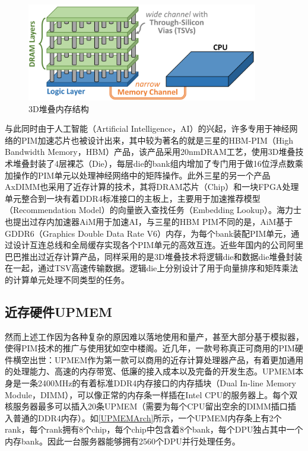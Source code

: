 \begin{figure}[!htbp]
	\centering
    \includegraphics[width=0.9\textwidth]{figures/3DStack.png}
    \caption{3D堆叠内存结构}
	\label{3DStack}
\end{figure}

与此同时由于人工智能（Artificial Intelligence，AI）的兴起，许多专用于神经网络的PIM加速芯片也被设计出来，其中较为著名的就是三星的HBM-PIM（High Bandwidth Memory，HBM）产品\cite{SamsungHBMPIM}，该产品采用20nmDRAM工艺，使用3D堆叠技术堆叠封装了4层裸芯（Die），每层die的bank组内增加了专门用于做16位浮点数乘加操作的PIM单元以处理神经网络中的矩阵操作。此外三星的另一个产品AxDIMM\cite{AxDIMM}也采用了近存计算的技术，其将DRAM芯片（Chip）和一块FPGA处理单元整合到一块有着DDR4标准接口的主板上，主要用于加速推荐模型（Recommendation Model）的向量嵌入查找任务（Embedding Lookup）。海力士也提出过存内加速器AiM\cite{AiM}用于加速AI，与三星的HBM PIM不同的是，AiM基于GDDR6（Graphics Double Data Rate V6）内存，为每个bank装配PIM单元，通过设计互连总线和全局缓存实现各个PIM单元的高效互连。近些年国内的公司阿里巴巴推出过近存计算产品\cite{AlibabaPIM}，同样采用的是3D堆叠技术将逻辑die和数据die堆叠封装在一起，通过TSV高速传输数据。逻辑die上分别设计了用于向量排序和矩阵乘法的计算单元处理不同类型的任务。

\subsection{近存硬件UPMEM}
然而上述工作因为各种复杂的原因难以落地使用和量产，甚至大部分基于模拟器，使得PIM技术的推广与使用犹如空中楼阁。近几年，一款号称真正可商用的PIM硬件横空出世：UPMEM作为第一款可以商用的近存计算处理器产品\cite{UPMEMHotChips}，有着更加通用的处理能力、高速的内存带宽、低廉的接入成本以及完备的开发生态。UPMEM本身是一条2400MHz的有着标准DDR4内存接口的内存插块（Dual In-line Memory Module，DIMM），可以像正常的内存条一样插在Intel CPU的服务器上。每个双核服务器最多可以插入20条UPMEM（需要为每个CPU留出空余的DIMM插口插入普通的DDR4内存）。如\ref{UPMEMArch}所示，一个UPMEM内存条上有2个rank，每个rank拥有8个chip，每个chip中包含着8个bank，每个DPU独占其中一个内存bank。因此一台服务器能够拥有2560个DPU并行处理任务。


